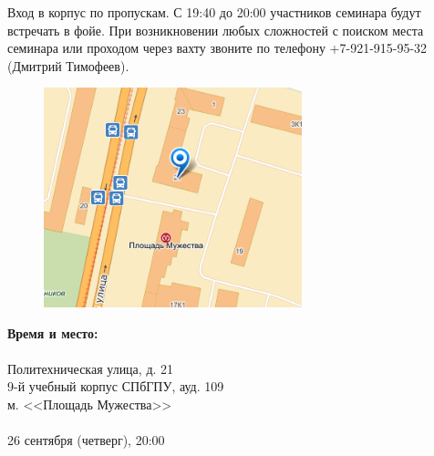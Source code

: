 \documentclass[12pt]{article}
\begin{document}
Вход в корпус по пропускам. С 19:40 до 20:00 участников семинара будут встречать в фойе. При возникновении любых сложностей с поиском места семинара или проходом через вахту звоните по телефону +7-921-915-95-32 (Дмитрий Тимофеев).\\

\begin{minipage}{0.5\textwidth}
\begin{figure}[H]
\includegraphics[width=7.5cm]{map.png} 
\end{figure}
\end{minipage} \hfill
\begin{minipage}{0.45\textwidth}
\textbf{Время и место:}\\
\\
Политехническая улица, д. 21\\
9-й учебный корпус СПбГПУ, ауд. 109\\
м. <<Площадь Мужества>>\\
\\
26 сентября (четверг), 20:00\\
\end{minipage}
\end{document}

